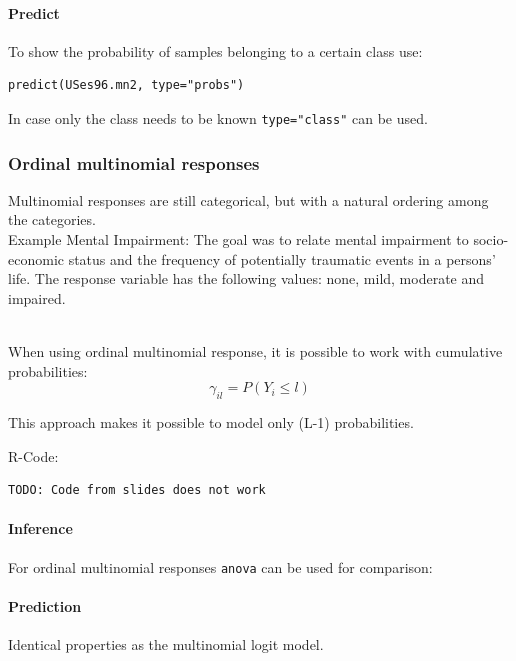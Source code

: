 \paragraph{Predict}
To show the probability of samples belonging to a certain class use:
\begin{lstlisting}
predict(USes96.mn2, type="probs")
\end{lstlisting}
In case only the class needs to be known \lstinline{type="class"} can be used.

\subsubsection{Ordinal multinomial responses}
Multinomial responses are still categorical, but with a natural ordering among the categories.\\
Example Mental Impairment: The goal was to relate mental impairment to socio-economic status and the frequency of potentially traumatic events in a persons’ life. The response variable has the following values: none, mild, moderate and impaired.

\mbox{}\\
When using ordinal multinomial response, it is possible to work with cumulative probabilities:
\begin{equation*}
\gamma_{il} = P(Y_i\leq l)
\end{equation*}

This approach makes it possible to model only (L-1) probabilities.

R-Code:
\begin{lstlisting}
TODO: Code from slides does not work
\end{lstlisting}

\paragraph{Inference}
For ordinal multinomial responses \lstinline{anova} can be used for comparison:

\paragraph{Prediction}
Identical properties as the multinomial logit model.
